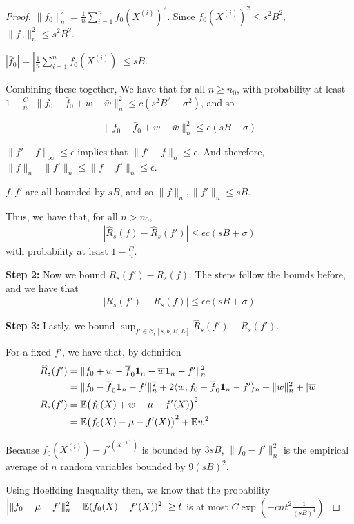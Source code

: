 \begin{proof}
$\|f_0\|^2_n = \frac{1}{n} \sum_{i=1}^n f_0(X^{(i)})^2$. Since $f_0(X^{(i)})^2 \leq s^2 B^2$, $\|f_0\|^2_n \leq s^2 B^2$.

$|\bar{f}_0| = | \frac{1}{n} \sum_{i=1}^n f_0(X^{(i)})| \leq s B$.

Combining these together, We have that for all $n \geq n_0$, with probability at least $1-\frac{C}{n}$, $\| f_0 - \bar{f}_0 + w -\bar{w} \|^2_n \leq c ( s^2 B^2 +\sigma^2 )$, and so 

\[
\|f_0 - \bar{f}_0 + w -\bar{w} \|^2_n \leq c (sB + \sigma)
\]

$\| f' - f \|_\infty \leq \epsilon$ implies that $\| f' - f\|_n \leq \epsilon$. And therefore, $\| f \|_n - \|f'\|_n \leq \| f - f' \|_n \leq \epsilon$. 

$f,f'$ are all bounded by $sB$, and so $\|f \|_n, \| f' \|_n \leq sB$.

Thus, we have that, for all $n > n_0$,
\begin{align}
|\hat{R}_s(f) - \hat{R}_s(f')| \leq \epsilon c( sB + \sigma ) \label{eqn:approx_deviation1}
\end{align}
with probability at least $1-\frac{C}{n}$.

\textbf{Step 2:} Now we bound $R_s(f') - R_s(f)$. The steps follow the bounds before, and we have that 
\begin{align}
|R_s(f') - R_s(f)| \leq \epsilon c(sB + \sigma) \label{eqn:approx_deviation2}
\end{align}

\textbf{Step 3:} Lastly, we bound $\sup_{f' \in \mathcal{C}_\epsilon[s,b,B,L]} \hat{R}_s(f') - R_s(f')$. 

For a fixed $f'$, we have that, by definition
\begin{align*}
\widehat{R}_s (f') &= \| f_0 + w - \overline{f}_0\mbox{\boldmath $1$}_n - \overline{w} \mbox{\boldmath $1$}_n - f' \|_n^2\\
     &= \| f_0  - \overline{f}_0\mbox{\boldmath $1$}_n - f'\|_n^2 
       + 2 \langle w, f_0 - \overline{f}_0\mbox{\boldmath $1$}_n - f'\rangle_n + \| w \|_n^2 + |\overline{w}|\\
R_s(f') &= {\mathbb E}\big(f_0(X) + w - \mu - f'(X)\big)^2 \\
     &= {\mathbb E}\big(f_0(X) - \mu - f'(X)\big)^2 + {\mathbb E} w^2  
\end{align*}

Because $f_0(X^{(i)}) - f'^(X^{(i)})$ is bounded by $3sB$, $\| f_0 - f'\|_n^2$ is the empirical average of $n$ random variables bounded by $9(sB)^2$. 

Using Hoeffding Inequality then, we know that the probability $\Big| \| f_0 -\mu - f' \|_n^2 - {\mathbb E}(f_0(X) - f '(X))^2 \Big| \geq t $ is at most $C \exp( - c n t^2 \frac{1}{(sB)^4})$. 


\end{proof}
